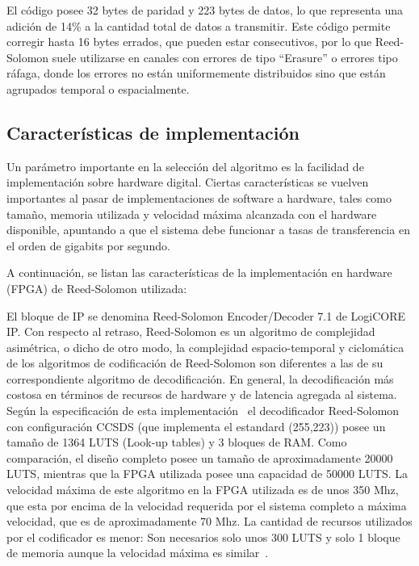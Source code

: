 El código posee 32 bytes de paridad y 223 bytes de datos, lo que representa una adición de 14\% a la cantidad total de datos a transmitir. Este código permite corregir hasta 16 bytes errados, que pueden estar consecutivos, por lo que Reed-Solomon suele utilizarse en canales con errores de tipo ``Erasure'' o errores tipo ráfaga, donde los errores no están uniformemente distribuidos sino que están agrupados temporal o espacialmente.


\subsection{Características de implementación}
Un parámetro importante en la selección del algoritmo es la facilidad de implementación sobre hardware digital. Ciertas características se vuelven importantes al pasar de implementaciones de software a hardware, tales como tamaño, memoria utilizada y velocidad máxima alcanzada con el hardware disponible, apuntando a que el sistema debe funcionar a tasas de transferencia en el orden de gigabits por segundo.

A continuación, se listan las características de la implementación en hardware (FPGA) de Reed-Solomon utilizada:

El bloque de IP se denomina Reed-Solomon Encoder/Decoder 7.1 de LogiCORE IP. Con respecto al retraso, Reed-Solomon es un algoritmo de complejidad asimétrica, o dicho de otro modo, la complejidad espacio-temporal y ciclomática de los algoritmos de codificación de Reed-Solomon son diferentes a las de su correspondiente algoritmo de decodificación. En general, la decodificación más costosa en términos de recursos de hardware y de latencia agregada al sistema. Según la especificación de esta implementación~\cite{Xilinx:DS252} el decodificador Reed-Solomon con configuración CCSDS \cite{coding1999consultative} (que implementa el estandard (255,223)) posee un tamaño de 1364 LUTS (Look-up tables) y 3 bloques de RAM. Como comparación, el diseño completo posee un tamaño de aproximadamente 20000 LUTS, mientras que la FPGA utilizada posee una capacidad de 50000 LUTS. La velocidad máxima de este algoritmo en la FPGA utilizada es de unos 350 Mhz, que esta por encima de la velocidad requerida por el sistema completo a máxima velocidad, que es de aproximadamente 70 Mhz.
La cantidad de recursos utilizados por el codificador es menor: Son necesarios solo unos 300 LUTS y solo 1 bloque de memoria aunque la velocidad máxima es similar~\cite{Xilinx:DS251}.

